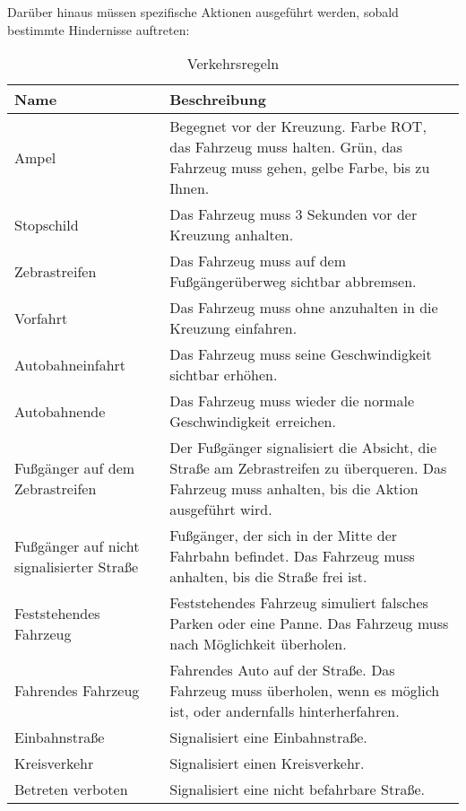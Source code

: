 Darüber hinaus müssen spezifische Aktionen ausgeführt werden, sobald bestimmte Hindernisse auftreten:

\begin{table}[!h]
\centering
\begin{tabular}{ |p{4cm}|p{11cm}| }
\hline
\rowcolor{pink!35}
\textbf{Name} & \textbf{Beschreibung} \\
\hline
\cline{1-2}
Ampel & Begegnet vor der Kreuzung. Farbe ROT, das Fahrzeug muss halten. Grün, das Fahrzeug muss gehen, gelbe Farbe, bis zu Ihnen.\\
\cline{1-2}
Stopschild & Das Fahrzeug muss 3 Sekunden vor der Kreuzung anhalten.\\
\cline{1-2}
Zebrastreifen & Das Fahrzeug muss auf dem Fußgängerüberweg sichtbar abbremsen. \\
\cline{1-2}
Vorfahrt &  Das Fahrzeug muss ohne anzuhalten in die Kreuzung einfahren. \\
\cline{1-2}
Autobahneinfahrt & Das Fahrzeug muss seine Geschwindigkeit sichtbar erhöhen. \\
\cline{1-2}
Autobahnende & Das Fahrzeug muss wieder die normale Geschwindigkeit erreichen. \\
\cline{1-2}
Fußgänger auf dem Zebrastreifen & Der Fußgänger signalisiert die Absicht, die Straße am Zebrastreifen zu überqueren. Das Fahrzeug muss anhalten, bis die Aktion ausgeführt wird. \\
\cline{1-2}
Fußgänger auf nicht signalisierter Straße & Fußgänger, der sich in der Mitte der Fahrbahn befindet. Das Fahrzeug muss anhalten, bis die Straße frei ist.\\
\cline{1-2}
Feststehendes Fahrzeug & Feststehendes Fahrzeug simuliert falsches Parken oder eine Panne. Das Fahrzeug muss nach Möglichkeit überholen. \\
\cline{1-2}
Fahrendes Fahrzeug & Fahrendes Auto auf der Straße. Das Fahrzeug muss überholen, wenn es möglich ist, oder andernfalls hinterherfahren. \\
\cline{1-2}
Einbahnstraße & Signalisiert eine Einbahnstraße.\\
\cline{1-2}
Kreisverkehr & Signalisiert einen Kreisverkehr.\\
\cline{1-2}
Betreten verboten & Signalisiert eine nicht befahrbare Straße.\\
\cline{1-2}
\end{tabular}
\caption{Verkehrsregeln}
\cite{bfmc-traficRule}
\label{traficRules}
\end{table}

